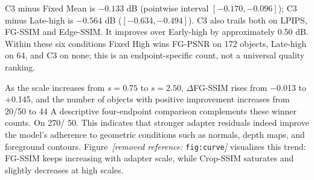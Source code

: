 \documentclass[times,twocolumn,final]{elsarticle}
\providecommand{\DIFadd}[1]{{\protect\color{blue} \sf #1}} %
\providecommand{\DIFdel}[1]{{\protect\color{red} \scriptsize #1}} %
\providecommand{\DIFaddbegin}{} %
\providecommand{\DIFaddend}{} %
\providecommand{\DIFdelbegin}{} %
\providecommand{\DIFdelend}{} %
\begin{document}
\DIFdelend \DIFaddbegin \DIFadd{C3 minus Fixed Mean is $-0.133$ dB (pointwise interval $[-0.170,-0.096]$); C3 minus Late-high is $-0.564$ dB ($[-0.634,-0.494]$). C3 also trails both on LPIPS, FG-SSIM and Edge-SSIM. It improves over Early-high by approximately 0.50 dB. Within these six conditions Fixed High wins FG-PSNR on 172 objects, Late-high on 64, and C3 on none; this is an endpoint-specific count, not a universal quality ranking.
}\DIFaddend 

\DIFdelbegin \DIFdel{As the scale increases from $s = 0.75$ to $s = 2.50$, $\Delta$FG-SSIM rises from $-$0.013 to +0.145, and the number of objects with positive improvement increases from 20/50 to 44}\DIFdelend \DIFaddbegin \DIFadd{A descriptive four-endpoint comparison complements these winner counts. On 270}\DIFaddend /\DIFdelbegin \DIFdel{50. This indicates that stronger adapter residuals indeed improve the model's adherence to geometric conditions such as normals, depth maps, and foreground contours. Figure~\textit{[removed reference: }\texttt{fig:curve}\textit{]} visualizes this trend: FG-SSIM keeps increasing with adapter scale, while Crop-SSIM saturates and slightly decreases at high scales.
}%
\end{document}
